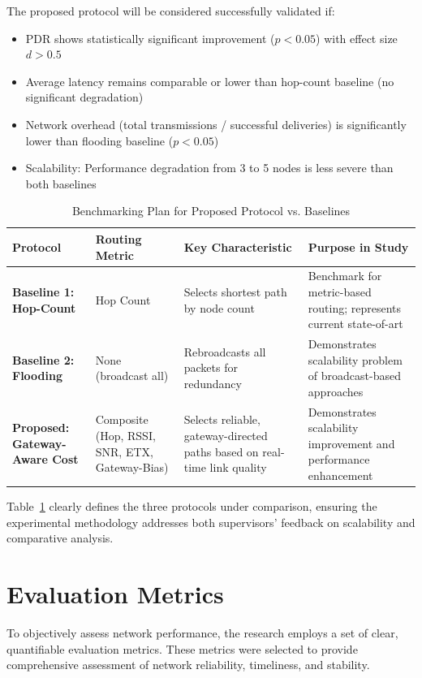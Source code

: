 The proposed protocol will be considered successfully validated if:
\begin{itemize}
\item PDR shows statistically significant improvement ($p < 0.05$) with effect size $d > 0.5$
\item Average latency remains comparable or lower than hop-count baseline (no significant degradation)
\item Network overhead (total transmissions / successful deliveries) is significantly lower than flooding baseline ($p < 0.05$)
\item Scalability: Performance degradation from 3 to 5 nodes is less severe than both baselines
\end{itemize}

\begin{table}[H]
\centering
\caption{Benchmarking Plan for Proposed Protocol vs. Baselines}
\label{tab:benchmarking-plan}
\begin{tabular}{p{4cm}p{3cm}p{3.5cm}p{3.5cm}}
\hline
\textbf{Protocol} & \textbf{Routing Metric} & \textbf{Key Characteristic} & \textbf{Purpose in Study} \\
\hline
\textbf{Baseline 1: Hop-Count} & Hop Count & Selects shortest path by node count & Benchmark for metric-based routing; represents current state-of-art \\
\hline
\textbf{Baseline 2: Flooding} & None (broadcast all) & Rebroadcasts all packets for redundancy & Demonstrates scalability problem of broadcast-based approaches \\
\hline
\textbf{Proposed: Gateway-Aware Cost} & Composite (Hop, RSSI, SNR, ETX, Gateway-Bias) & Selects reliable, gateway-directed paths based on real-time link quality & Demonstrates scalability improvement and performance enhancement \\
\hline
\end{tabular}
\end{table}

Table~\ref{tab:benchmarking-plan} clearly defines the three protocols under comparison, ensuring the experimental methodology addresses both supervisors' feedback on scalability and comparative analysis.

\section{Evaluation Metrics}

To objectively assess network performance, the research employs a set of clear, quantifiable evaluation metrics. These metrics were selected to provide comprehensive assessment of network reliability, timeliness, and stability.

